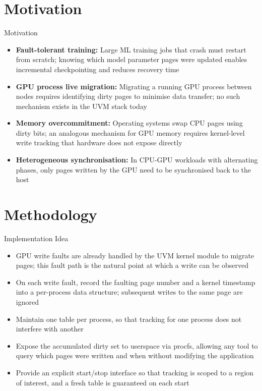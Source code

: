 \documentclass [xcolor=svgnames, t] {beamer}
\begin{document}
\section{Motivation}
\begin{frame}{Motivation}
\begin{itemize}
    \item \textbf{Fault-tolerant training:} Large ML training jobs that crash must restart from scratch; knowing which model parameter pages were updated enables incremental checkpointing and reduces recovery time
    \item \textbf{GPU process live migration:} Migrating a running GPU process between nodes requires identifying dirty pages to minimise data transfer; no such mechanism exists in the UVM stack today
    \item \textbf{Memory overcommitment:} Operating systems swap CPU pages using dirty bits; an analogous mechanism for GPU memory requires kernel-level write tracking that hardware does not expose directly
    \item \textbf{Heterogeneous synchronisation:} In CPU-GPU workloads with alternating phases, only pages written by the GPU need to be synchronised back to the host
\end{itemize}
\end{frame}

\section{Methodology}
\begin{frame}{Implementation Idea}
\begin{itemize}
    \item GPU write faults are already handled by the UVM kernel module to migrate pages; this fault path is the natural point at which a write can be observed
    \item On each write fault, record the faulting page number and a kernel timestamp into a per-process data structure; subsequent writes to the same page are ignored
    \item Maintain one table per process, so that tracking for one process does not interfere with another
    \item Expose the accumulated dirty set to userspace via procfs, allowing any tool to query which pages were written and when without modifying the application
    \item Provide an explicit start/stop interface so that tracking is scoped to a region of interest, and a fresh table is guaranteed on each start
\end{itemize}
\end{frame}
\end{document}
